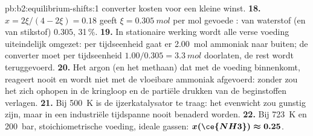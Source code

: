 \begin{solution}{pb:b2:equilibrium-shifts:1}
converter kosten voor een kleine winst.
\textbf{18.} $x = 2\xi/(4 - 2\xi) = 0.18$ geeft $\xi = \qty{0.305}{mol}$ per
mol gevoede :  van waterstof (en van stikstof)
$0.305$, 31\,\%.
\textbf{19.} In stationaire werking wordt alle verse voeding uiteindelijk omgezet:
per tijdseenheid gaat er \qty{2.00}{mol} ammoniak naar buiten; de converter moet per tijdseenheid $1.00/
0.305 = \qty{3.3}{mol}$  doorlaten, de rest wordt teruggevoerd.
\textbf{20.} Het argon (en het methaan) dat met de voeding binnenkomt, reageert nooit en
wordt niet met de vloeibare ammoniak afgevoerd: zonder  zou het zich
ophopen in de kringloop en de partiële drukken van de beginstoffen verlagen.
\textbf{21.} Bij \qty{500}{K} is de ijzerkatalysator te traag: het evenwicht
zou gunstig zijn, maar in een industriële tijdspanne nooit benaderd worden.
\textbf{22.} Bij \qty{723}{K} en \qty{200}{bar}, stoichiometrische voeding, ideale
gassen: $\boldsymbol{x(\ce{NH3}) \approx 0.25}$.
\end{solution}
